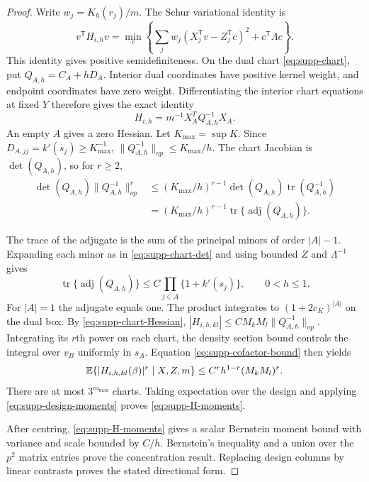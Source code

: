 \begin{proof}
Write $w_j=K_h(r_j)/m$.
The Schur variational identity is
\begin{equation}\label{eq:supp-H-variational}
 v^{\mathsf T}H_{i,h}v=
 \min_c\left\{\sum_jw_j(X_j^{\mathsf T}v-Z_j^{\mathsf T}c)^2
                                      +c^{\mathsf T}\Lambda c\right\}.
\end{equation}
This identity gives positive semidefiniteness. On the dual chart
\eqref{eq:supp-chart}, put $Q_{A,h}=C_A+hD_A$. Interior dual
coordinates have positive kernel weight, and endpoint coordinates
have zero weight. Differentiating the interior chart equations at
fixed $Y$ therefore gives the exact identity
\begin{equation}\label{eq:supp-chart-Hessian}
 H_{i,h}=m^{-1}X_A^TQ_{A,h}^{-1}X_A.
\end{equation}
An empty $A$ gives a zero Hessian. Let $K_{\max}=\sup K$.
Since $D_{A,jj}=k'(s_j)\geq K_{\max}^{-1}$,
$\|Q_{A,h}^{-1}\|_{op}\leq K_{\max}/h$.
The chart Jacobian is $\det(Q_{A,h})$, so for $r\geq2$,
\begin{align}
 \det(Q_{A,h})\|Q_{A,h}^{-1}\|_{op}^{r}
 &\leq (K_{\max}/h)^{r-1}
          \det(Q_{A,h})\operatorname{tr}(Q_{A,h}^{-1})\nonumber\\
 &= (K_{\max}/h)^{r-1}
          \operatorname{tr}\{\operatorname{adj}(Q_{A,h})\}.
 \label{eq:supp-cofactor-bound}
\end{align}

The trace of the adjugate is the sum of the principal minors of
order $|A|-1$. Expanding each minor as in
\eqref{eq:supp-chart-det} and using bounded $Z$ and
$\Lambda^{-1}$ gives
\[
 \operatorname{tr}\{\operatorname{adj}(Q_{A,h})\}
       \leq C\prod_{j\in A}\{1+k'(s_j)\},\qquad 0<h\leq1.
\]
For $|A|=1$ the adjugate equals one. The product integrates to
$(1+2c_K)^{|A|}$ on the dual box. By
\eqref{eq:supp-chart-Hessian},
$|H_{i,h,kl}|\leq CM_kM_l\|Q_{A,h}^{-1}\|_{op}$.
Integrating its $r$th power on each chart, the density section bound
controls the integral over $v_B$ uniformly in $s_A$. Equation
\eqref{eq:supp-cofactor-bound} then yields
\[
 \mathbb{E}\{|H_{i,h,kl}(\beta)|^r\mid X,Z,m\}
       \leq C^r h^{1-r}(M_kM_l)^r.
\]
There are at most $3^{m_{\max}}$ charts. Taking expectation over
the design and applying \eqref{eq:supp-design-moments} proves
\eqref{eq:supp-H-moments}.

After centring, \eqref{eq:supp-H-moments} gives a scalar Bernstein
moment bound with variance and scale bounded by $C/h$.
Bernstein's inequality and a union over the $p^2$ matrix entries
prove the concentration result. Replacing design columns by linear
contrasts proves the stated directional form.
\end{proof}


